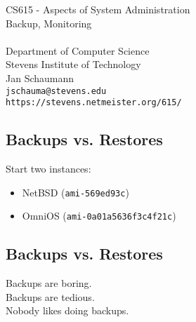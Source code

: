 \documentclass[xga]{xdvislides}
\begin{document}
\setfontphv

\lhead{\slidetitle}                               %
\cfoot{\relax}                               %
\rfoot{\Gray{\today}}

\newcommand{\smallish}{\fontsize{16}{16}\selectfont}

\vspace*{\fill}
\begin{center}
	\Hugesize
		CS615 - Aspects of System Administration\\ [1em]
		Backup, Monitoring\\ [1em]
	\hspace*{5mm}\blueline\\ [1em]
	\Normalsize
		Department of Computer Science\\
		Stevens Institute of Technology\\
		Jan Schaumann\\
		\verb+jschauma@stevens.edu+\\
		\verb+https://stevens.netmeister.org/615/+
\end{center}
\vspace*{\fill}

\subsection{Backups vs. Restores}
Start two instances:

\begin{itemize}
	\item NetBSD ({\tt ami-569ed93c})
	\item OmniOS ({\tt ami-0a01a5636f3c4f21c})
\end{itemize}

\subsection{Backups vs. Restores}
\Huge
\begin{center}
Backups are boring. \\
\vspace{.5in}
Backups are tedious. \\
\vspace{.5in}
Nobody likes doing backups. \\
\end{center}
\Normalsize
\end{document}
